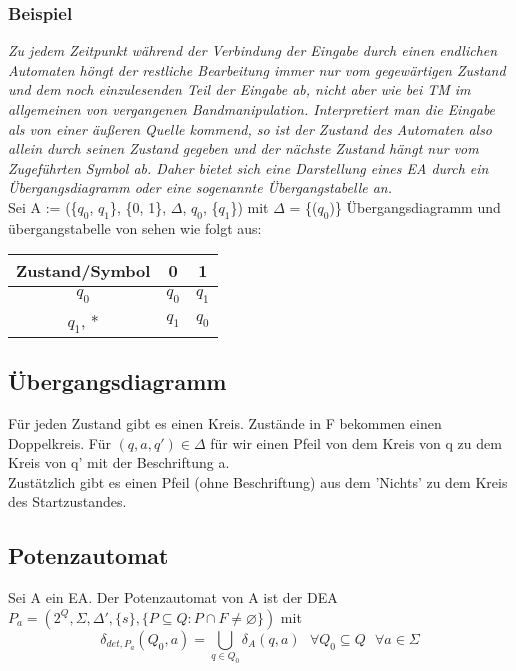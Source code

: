     \subsubsection*{Beispiel}
    \textit{Zu jedem Zeitpunkt während der Verbindung der Eingabe durch einen endlichen Automaten höngt der restliche Bearbeitung immer nur vom gegewärtigen Zustand und dem noch einzulesenden Teil der Eingabe ab, nicht aber wie bei TM im allgemeinen von vergangenen Bandmanipulation. Interpretiert man die Eingabe als von einer äußeren Quelle kommend, so ist der  Zustand des Automaten also allein durch seinen Zustand gegeben und der nächste Zustand hängt nur vom Zugeführten Symbol ab. Daher bietet sich eine Darstellung eines EA durch ein Übergangsdiagramm oder eine sogenannte Übergangstabelle an.}\\
    Sei A := (\{$q_{0}$, $q_{1}$\}, \{0, 1\}, $\Delta$, $q_{0}$, \{$q_{1}$\}) mit $\Delta$ = \{($q_{0}$)\}
Übergangsdiagramm und übergangstabelle von sehen wie folgt aus:
\begin{center}
    \begin{tabular}{|c|c|c|}
        \hline
        Zustand/Symbol & 0 & 1 \\
        \hline
        $q_{0}$ & $q_{0}$ & $q_{1}$ \\
        \hline
        $q_{1}$, * & $q_{1}$ & $q_{0}$ \\
        \hline
    \end{tabular}            
\end{center}
\subsection{Übergangsdiagramm}
    Für jeden Zustand gibt es einen Kreis. Zustände in F bekommen einen Doppelkreis. Für \((q,a,q')\in\Delta\) für wir 
    einen Pfeil von dem Kreis von q zu dem Kreis von q' mit der Beschriftung a.\\
    Zustätzlich gibt es einen Pfeil (ohne Beschriftung) aus dem 'Nichts' zu dem Kreis des Startzustandes.
\subsection{Potenzautomat}
    Sei A ein EA. Der Potenzautomat von A ist der DEA \(P_a=(2^Q, \Sigma, \Delta',\{s\},\{P\subseteq Q:P\cap F\neq\varnothing\})\) mit
    \[\delta_{det,P_a}(Q_0,a)=\bigcup\limits_{q\in Q_0}\delta_A(q,a)\text{ }\forall Q_0\subseteq Q\text{ }\forall a\in\Sigma\]
